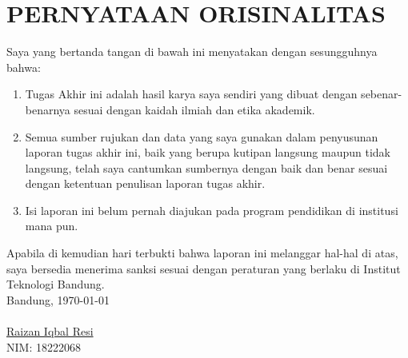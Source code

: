 \chapter*{PERNYATAAN ORISINALITAS}
\vspace{2cm}
Saya yang bertanda tangan di bawah ini menyatakan dengan sesungguhnya bahwa:
\begin{enumerate}
    \item Tugas Akhir ini adalah hasil karya saya sendiri yang dibuat dengan sebenar-benarnya sesuai dengan kaidah ilmiah dan etika akademik.
    \item Semua sumber rujukan dan data yang saya gunakan dalam penyusunan laporan tugas akhir ini, baik yang berupa kutipan langsung maupun tidak langsung, telah saya cantumkan sumbernya dengan baik dan benar sesuai dengan ketentuan penulisan laporan tugas akhir.
    \item Isi laporan ini belum pernah diajukan pada program pendidikan di institusi mana pun.
\end{enumerate}
Apabila di kemudian hari terbukti bahwa laporan ini melanggar hal-hal di atas, saya bersedia menerima sanksi sesuai dengan peraturan yang berlaku di Institut Teknologi Bandung.
\\[2cm]
Bandung, \today\\
\\[2cm]

\underline{Raizan Iqbal Resi} \\
NIM: 18222068
  